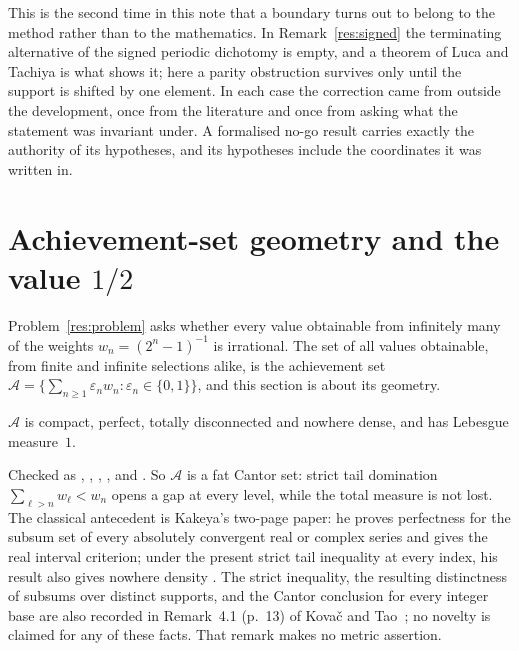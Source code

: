 \documentclass[11pt]{article}
\newcommand{\wgt}[1]{w_{#1}}
\newcommand{\Ach}{\mathcal A}
\begin{document}
This is the second time in this note that a boundary turns out to belong to
the method rather than to the mathematics.  In Remark~\ref{res:signed} the
terminating alternative of the signed periodic dichotomy is empty, and a
theorem of Luca and Tachiya is what shows it; here a parity obstruction
survives only until the support is shifted by one element.  In each case the
correction came from outside the development, once from the literature and once
from asking what the statement was invariant under.  A formalised no-go result
carries exactly the authority of its hypotheses, and its hypotheses include the
coordinates it was written in.

\section{Achievement-set geometry and the value \texorpdfstring{$1/2$}{1/2}}
\label{sec:geometry}

Problem~\ref{res:problem} asks whether every value obtainable from infinitely
many of the weights $\wgt n=(2^n-1)^{-1}$ is irrational.  The set of all values
obtainable, from finite and infinite selections alike, is the achievement set
$\Ach=\{\sum_{n\ge1}\varepsilon_n\wgt n:\varepsilon_n\in\{0,1\}\}$, and this
section is about its geometry.

\begin{theorem}[geometry of $\Ach$]\label{res:geometry}
$\Ach$ is compact, perfect, totally disconnected and nowhere dense, and has
Lebesgue measure~$1$.
\end{theorem}

\noindent Checked as
,
,
,
,
and
.
So $\Ach$ is a fat Cantor set: strict tail domination
$\sum_{\ell>n}\wgt\ell<\wgt n$ opens a gap at every level, while the total
measure is not lost.  The classical antecedent is Kakeya's two-page paper: he
proves perfectness for the subsum set of every absolutely convergent real or
complex series and gives the real interval criterion; under the present
strict tail inequality at every index, his result also gives nowhere density
\cite[p.~251]{kakeya1914}.  The strict inequality, the resulting distinctness
of subsums over distinct supports, and the Cantor conclusion for every integer
base are also recorded in Remark~4.1 (p.~13) of Kova\v{c} and
Tao~\cite{kovactao}; no novelty is claimed for any of these facts.  That
remark makes no metric assertion.
\end{document}
